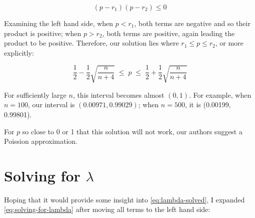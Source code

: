\documentclass{article}
\begin{document}
\begin{equation*}
  (p - r_1)(p - r_2) \leq 0
\end{equation*}

Examining the left hand side, when $p < r_1$, both terms are negative and so
their product is positive; when $p > r_2$, both terms are positive, again
leading the product to be positive. Therefore, our solution lies where $r_1
\leq p \leq r_2$, or more explicitly:

\begin{equation}
 \frac12 - \frac12 \sqrt{\frac{n}{n+4}} \; \leq \; p \; \leq \; \frac12 + \frac12 \sqrt{\frac{n}{n+4}}
\end{equation}

For sufficiently large $n$, this interval becomes almost $(0, 1)$. For example,
when $n=100$, our interval is $(0.00971, 0.99029)$; when $n=500$, it is
(0.00199, 0.99801).

For $p$ so close to 0 or 1 that this solution will not work, our authors
suggest a Poission approximation.

\appendix
\section{Solving for $\lambda$}
\label{sec:solving-for-lambda}

Hoping that it would provide some insight into \eqref{eq:lambda-solved}, I
expanded \eqref{eq:solving-for-lambda} after moving all terms to the left hand
side:
\end{document}

